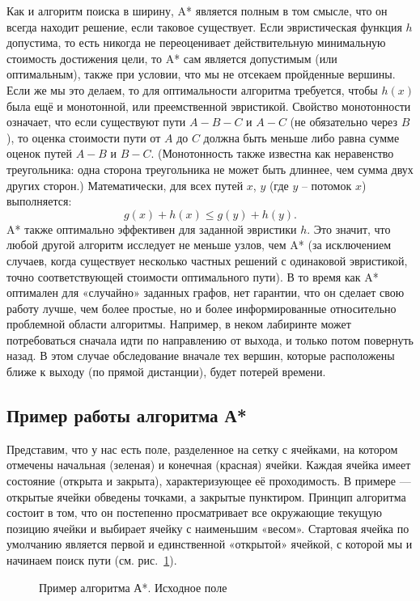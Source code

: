 Как и алгоритм поиска в ширину, A* является полным в том смысле, что он всегда находит решение, если таковое существует.
Если эвристическая функция $h$ допустима, то есть никогда не переоценивает действительную минимальную стоимость достижения цели, то A* сам является допустимым (или оптимальным), также при условии, что мы не отсекаем пройденные вершины. 
Если же мы это делаем, то для оптимальности алгоритма требуется, чтобы $h(x)$ была ещё и монотонной, или преемственной эвристикой.
Свойство монотонности означает, что если существуют пути $A-B-C$ и $A-C$ (не обязательно через $B$), то оценка стоимости пути от $A$ до $C$ должна быть меньше либо равна сумме оценок путей $A-B$ и $B-C$. 
(Монотонность также известна как неравенство треугольника: одна сторона треугольника не может быть длиннее, чем сумма двух других сторон.) 
Математически, для всех путей $x$, $y$ (где $y$ -- потомок $x$) выполняется:
\begin{equation}
 g(x) + h(x) \le g(y) + h(y).
\end{equation}
A* также оптимально эффективен для заданной эвристики $h$. Это значит, что любой другой алгоритм исследует не меньше узлов, чем A* (за исключением случаев, когда существует несколько частных решений с одинаковой эвристикой, точно соответствующей стоимости оптимального пути).
В то время как A* оптимален для «случайно» заданных графов, нет гарантии, что он сделает свою работу лучше, чем более простые, но и более информированные относительно проблемной области алгоритмы. 
Например, в неком лабиринте может потребоваться сначала идти по направлению от выхода, и только потом повернуть назад. 
В этом случае обследование вначале тех вершин, которые расположены ближе к выходу (по прямой дистанции), будет потерей времени.\cite{AI}

\subsection{Пример работы алгоритма А*}


Представим, что у нас есть поле, разделенное на сетку с ячейками, на котором отмечены начальная (зеленая) и конечная (красная) ячейки.
Каждая ячейка имеет состояние (открыта и закрыта), характеризующее её проходимость. 
В примере --- открытые ячейки обведены точками, а закрытые пунктиром.
Принцип алгоритма состоит в том, что он постепенно просматривает все окружающие текущую позицию ячейки и выбирает ячейку с наименьшим «весом».
Стартовая ячейка по умолчанию является первой и единственной «открытой» ячейкой, с которой мы и начинаем поиск пути (см. рис.~\ref{ris:astar-1}).
\begin{figure}[ht]
\caption{Пример алгоритма А*. Исходное поле}
\label{ris:astar-1}
\end{figure}

